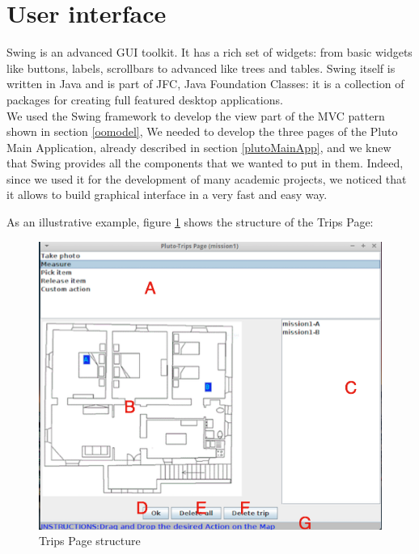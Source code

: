\section{User interface}\label{interface}

Swing is an advanced GUI toolkit. It has a rich set of widgets:
from basic widgets like buttons, labels, scrollbars to advanced like trees and tables. 
Swing itself is written in Java and is part of JFC, Java Foundation Classes: it is a collection of packages for creating full featured desktop applications.
\\

We used the Swing framework to develop the view part of the MVC pattern shown in section \ref{oomodel},
We needed to develop the three pages of the Pluto Main Application, already described in section \ref{plutoMainApp}, and we knew that Swing provides all the components that we wanted to put in them.
Indeed, since we used it for the development of many academic projects, we noticed that it allows to build graphical interface in a very fast and easy way.

As an illustrative example, figure \ref{fig:tripsPageStructure} shows the structure of the Trips Page:

 \begin{figure}[h!]
 \includegraphics[width=\linewidth]
 {pictures/tripsPageStructure.png}
 \caption{Trips Page structure}
 \label{fig:tripsPageStructure}
 \end{figure}


